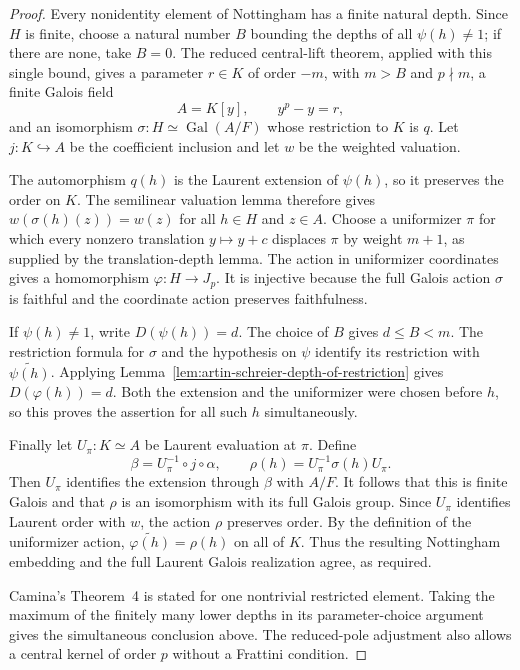 \begin{proof}
Every nonidentity element of Nottingham has a finite natural depth.
Since $H$ is finite, choose a natural number $B$ bounding the depths
of all $\psi(h)\ne1$; if there are none, take $B=0$.
The reduced central-lift theorem, applied with this single bound,
gives a parameter $r\in K$ of order $-m$, with $m>B$ and
$p\nmid m$, a finite Galois field
\[
 A=K[y],\qquad y^p-y=r,
\]
and an isomorphism $\sigma:H\simeq\operatorname{Gal}(A/F)$
whose restriction to $K$ is $q$. Let $j:K\hookrightarrow A$
be the coefficient inclusion and let $w$ be the weighted valuation.

The automorphism $q(h)$ is the Laurent extension of $\psi(h)$,
so it preserves the order on $K$. The semilinear valuation lemma
therefore gives $w(\sigma(h)(z))=w(z)$ for all $h\in H$ and
$z\in A$. Choose a uniformizer $\pi$ for which every nonzero
translation $y\mapsto y+c$ displaces $\pi$ by weight $m+1$,
as supplied by the translation-depth lemma.
The action in uniformizer coordinates gives a homomorphism
$\varphi:H\to J_p$. It is injective because the full Galois
action $\sigma$ is faithful and the coordinate action preserves
faithfulness.

If $\psi(h)\ne1$, write $D(\psi(h))=d$.
The choice of $B$ gives $d\le B<m$. The restriction formula for
$\sigma$ and the hypothesis on $\psi$ identify its restriction
with $\widetilde{\psi(h)}$. Applying
Lemma~\ref{lem:artin-schreier-depth-of-restriction} gives
$D(\varphi(h))=d$. Both the extension and the uniformizer were
chosen before $h$, so this proves the assertion for all such
$h$ simultaneously.

Finally let $U_\pi:K\simeq A$ be Laurent evaluation at $\pi$.
Define
\[
 \beta=U_\pi^{-1}\circ j\circ\alpha,
 \qquad
 \rho(h)=U_\pi^{-1}\sigma(h)U_\pi.
\]
Then $U_\pi$ identifies the extension through $\beta$ with
$A/F$. It follows that this is finite Galois and that $\rho$
is an isomorphism with its full Galois group. Since $U_\pi$
identifies Laurent order with $w$, the action $\rho$ preserves
order. By the definition of the uniformizer action,
$\widetilde{\varphi(h)}=\rho(h)$ on all of $K$.
Thus the resulting Nottingham embedding and the full Laurent
Galois realization agree, as required.

Camina's Theorem~4 is stated for one nontrivial restricted element.
Taking the maximum of the finitely many lower depths in its
parameter-choice argument gives the simultaneous conclusion above.
The reduced-pole adjustment also allows a central kernel of order
$p$ without a Frattini condition.
\end{proof}

